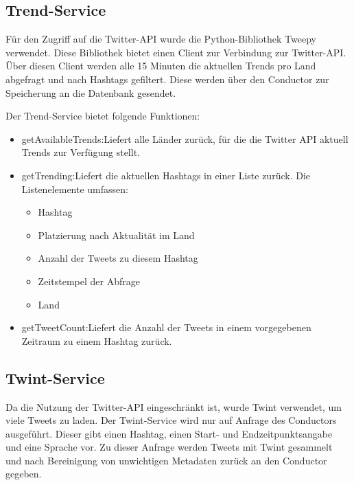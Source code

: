 \documentclass[conference]{IEEEtran}
\begin{document}
\subsection*{Trend-Service}
Für den Zugriff auf die Twitter-API wurde die Python-Bibliothek Tweepy \cite{tweepy} verwendet.
Diese Bibliothek bietet einen Client zur Verbindung zur Twitter-API.
Über diesen Client werden alle 15 Minuten die aktuellen Trends pro Land abgefragt und nach Hashtags gefiltert.
Diese werden über den Conductor zur Speicherung an die Datenbank gesendet.

Der Trend-Service bietet folgende Funktionen:
\begin{itemize}

    \item getAvailableTrends:\newline Liefert alle Länder zurück, für die die Twitter API aktuell Trends zur Verfügung stellt.
    \item getTrending:\newline Liefert die aktuellen Hashtags in einer Liste zurück. Die Listenelemente umfassen:
          \begin{itemize}
              \item Hashtag
              \item Platzierung nach Aktualität im Land
              \item Anzahl der Tweets zu diesem Hashtag
              \item Zeitstempel der Abfrage
              \item Land
          \end{itemize}
    \item getTweetCount:\newline Liefert die Anzahl der Tweets in einem vorgegebenen Zeitraum zu einem Hashtag zurück.

\end{itemize}

\subsection*{Twint-Service}
Da die Nutzung der Twitter-API eingeschränkt ist, wurde Twint verwendet, um viele Tweets zu laden.
Der Twint-Service wird nur auf Anfrage des Conductors ausgeführt.
Dieser gibt einen Hashtag, einen Start- und Endzeitpunktsangabe und eine Sprache vor.
Zu dieser Anfrage werden Tweets mit Twint gesammelt und nach Bereinigung von unwichtigen Metadaten zurück an den Conductor gegeben.
\end{document}
